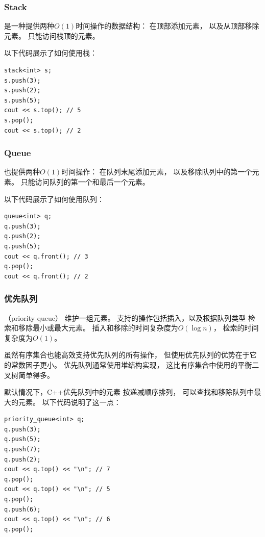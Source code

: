 \subsubsection{Stack}


是一种提供两种$O(1)$时间操作的数据结构：
在顶部添加元素，
以及从顶部移除元素。
只能访问栈顶的元素。

以下代码展示了如何使用栈：
\begin{lstlisting}
stack<int> s;
s.push(3);
s.push(2);
s.push(5);
cout << s.top(); // 5
s.pop();
cout << s.top(); // 2
\end{lstlisting}
\subsubsection{Queue}


也提供两种$O(1)$时间操作：
在队列末尾添加元素，
以及移除队列中的第一个元素。
只能访问队列的第一个和最后一个元素。

以下代码展示了如何使用队列：
\begin{lstlisting}
queue<int> q;
q.push(3);
q.push(2);
q.push(5);
cout << q.front(); // 3
q.pop();
cout << q.front(); // 2
\end{lstlisting}

\subsubsection{优先队列}


（priority queue）
维护一组元素。
支持的操作包括插入，以及根据队列类型
检索和移除最小或最大元素。
插入和移除的时间复杂度为$O(\log n)$，
检索的时间复杂度为$O(1)$。

虽然有序集合也能高效支持优先队列的所有操作，
但使用优先队列的优势在于它的常数因子更小。
优先队列通常使用堆结构实现，
这比有序集合中使用的平衡二叉树简单得多。

\begin{samepage}
默认情况下，C++优先队列中的元素
按递减顺序排列，
可以查找和移除队列中最大的元素。
以下代码说明了这一点：

\begin{lstlisting}
priority_queue<int> q;
q.push(3);
q.push(5);
q.push(7);
q.push(2);
cout << q.top() << "\n"; // 7
q.pop();
cout << q.top() << "\n"; // 5
q.pop();
q.push(6);
cout << q.top() << "\n"; // 6
q.pop();
\end{lstlisting}
\end{samepage}

